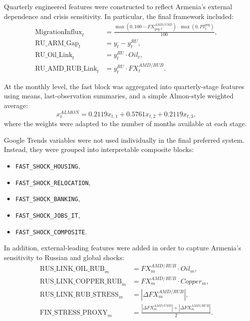 \documentclass[12pt,a4paper]{article}
\begin{document}
Quarterly engineered features were constructed to reflect Armenia's external dependence and crisis sensitivity. In particular, the final framework included:
\begin{align}
    \text{MigrationInflux}_t &= \frac{\max(0, 100 - FX^{AMD/USD}_{yoy,t}) \cdot \max(0, PI^{yoy}_t)}{100}, \\
    \text{RU\_ARM\_Gap}_t &= y_t - y^{RU}_t, \\
    \text{RU\_Oil\_Link}_t &= y^{RU}_t \cdot Oil_t, \\
    \text{RU\_AMD\_RUB\_Link}_t &= y^{RU}_t \cdot FX^{AMD/RUB}_t.
\end{align}

At the monthly level, the fast block was aggregated into quarterly-stage features using means, last-observation summaries, and a simple Almon-style weighted average:
\begin{equation}
    x^{ALMON}_{t} = 0.2119 x_{t,1} + 0.5761 x_{t,2} + 0.2119 x_{t,3},
\end{equation}
where the weights were adapted to the number of months available at each stage.

Google Trends variables were not used individually in the final preferred system. Instead, they were grouped into interpretable composite blocks:
\begin{itemize}
    \item \texttt{FAST\_SHOCK\_HOUSING},
    \item \texttt{FAST\_SHOCK\_RELOCATION},
    \item \texttt{FAST\_SHOCK\_BANKING},
    \item \texttt{FAST\_SHOCK\_JOBS\_IT},
    \item \texttt{FAST\_SHOCK\_COMPOSITE}.
\end{itemize}

In addition, external-leading features were added in order to capture Armenia's sensitivity to Russian and global shocks:
\begin{align}
    \text{RUS\_LINK\_OIL\_RUB}_m &= FX^{AMD/RUB}_m \cdot Oil_m, \\
    \text{RUS\_LINK\_COPPER\_RUB}_m &= FX^{AMD/RUB}_m \cdot Copper_m, \\
    \text{RUS\_LINK\_RUB\_STRESS}_m &= \left| \Delta FX^{AMD/RUB}_m \right|, \\
    \text{FIN\_STRESS\_PROXY}_m &= \frac{\left| \Delta FX^{AMD/USD}_m \right| + \left| \Delta FX^{AMD/RUB}_m \right|}{2}.
\end{align}
\end{document}
